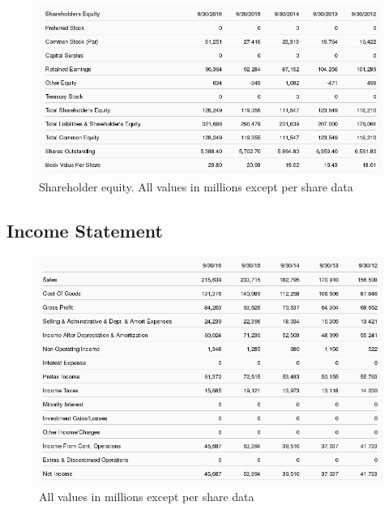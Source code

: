 \documentclass[12pt,a4paper,titlepage]{article}
\begin{document}
\begin{figure}[!htb]
  \centering
  \includegraphics[width=1\textwidth]{shareholder}
    \caption{Shareholder equity. All values in millions except per share
      data~\cite{zacks-bal}}
\end{figure}

\newpage                        %

\subsection{Income Statement}
\begin{figure}[!htb]
  \centering
  \includegraphics[width=1\textwidth]{income}
    \caption{All values in millions except per share data~\cite{zacks-income}}
\end{figure}

\newpage
\end{document}
